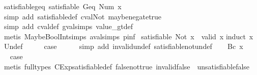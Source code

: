 \begin{isabellebody}
\endisatagproof
{\isafoldproof}%
%
\isadelimproof
\isanewline
%
\endisadelimproof
\isanewline
{}\isamarkupfalse%
\ satisfiable{\isacharunderscore}geq{\isacharcolon}\ {\isachardoublequoteopen}satisfiable\ {\isacharparenleft}Geq\ {\isacharparenleft}Num\ x{\isacharparenright}{\isacharparenright}{\isachardoublequoteclose}\isanewline
%
\isadelimproof
\ \ %
\endisadelimproof
%
\isatagproof
{}\isamarkupfalse%
\ {\isacharparenleft}simp\ add{\isacharcolon}\ satisfiable{\isacharunderscore}def\ cval{\isacharunderscore}Not\ maybe{\isacharunderscore}negate{\isacharunderscore}true{\isacharparenright}\isanewline
\ \ \isamarkupfalse%
\ {\isacharparenleft}simp\ add{\isacharcolon}\ cval{\isacharunderscore}def\ gval{\isachardot}simps\ value_gt{\isacharunderscore}def{\isacharparenright}\isanewline
\ \ \isamarkupfalse%
\ {\isacharparenleft}metis\ MaybeBoolInt{\isachardot}simps{\isacharparenleft}{}{\isacharparenright}\ aval{\isachardot}simps{\isacharparenleft}{}{\isacharparenright}\ pinf{\isacharparenleft}{}{\isacharparenright}{\isacharparenright}%
\endisatagproof
{\isafoldproof}%
%
\isadelimproof
\isanewline
%
\endisadelimproof
\isanewline
{}\isamarkupfalse%
\ {\isachardoublequoteopen}satisfiable\ {\isacharparenleft}Not\ x{\isacharparenright}\ {\isasymLongrightarrow}\ {\isasymnot}valid\ x{\isachardoublequoteclose}\isanewline
%
\isadelimproof
%
\endisadelimproof
%
\isatagproof
{}\isamarkupfalse%
{\isacharparenleft}induct\ x{\isacharparenright}\isanewline
{}\isamarkupfalse%
\ Undef\isanewline
\ \ \isamarkupfalse%
\ \isamarkupfalse%
\ {\isacharquery}case\isanewline
\ \ \ \ \isamarkupfalse%
\ {\isacharparenleft}simp\ add{\isacharcolon}\ invalid{\isacharunderscore}undef\ satisfiable{\isacharunderscore}not{\isacharunderscore}undef{\isacharparenright}\isanewline
{}\isamarkupfalse%
\isanewline
\ \ \isamarkupfalse%
\ {\isacharparenleft}Bc\ x{\isacharparenright}\isanewline
\ \ \isamarkupfalse%
\ \isamarkupfalse%
\ {\isacharquery}case\isanewline
\ \ \ \ \isamarkupfalse%
\ {\isacharparenleft}metis\ {\isacharparenleft}full{\isacharunderscore}types{\isacharparenright}\ CExp{\isachardot}satisfiable{\isacharunderscore}def\ false{\isacharunderscore}not{\isacharunderscore}true\ invalid{\isacharunderscore}false\ \ unsatisfiable{\isacharunderscore}false{\isacharparenright}\isanewline
{}\isamarkupfalse%
\isanewline

\end{isabellebody}
